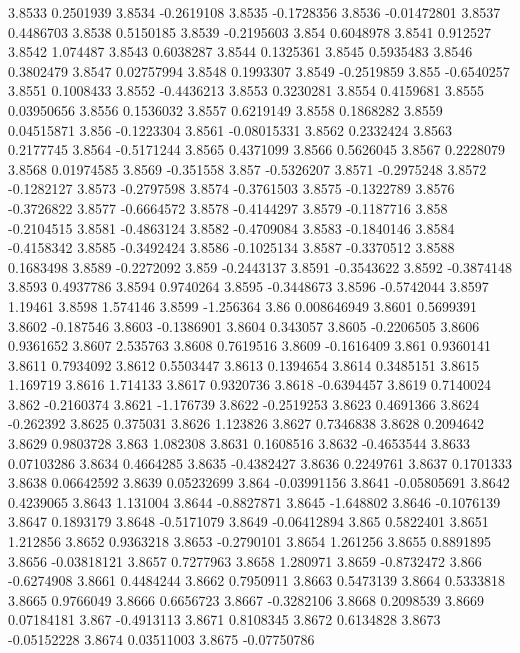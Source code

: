 3.8533  0.2501939
3.8534  -0.2619108
3.8535  -0.1728356
3.8536  -0.01472801
3.8537  0.4486703
3.8538  0.5150185
3.8539  -0.2195603
3.854  0.6048978
3.8541  0.912527
3.8542  1.074487
3.8543  0.6038287
3.8544  0.1325361
3.8545  0.5935483
3.8546  0.3802479
3.8547  0.02757994
3.8548  0.1993307
3.8549  -0.2519859
3.855  -0.6540257
3.8551  0.1008433
3.8552  -0.4436213
3.8553  0.3230281
3.8554  0.4159681
3.8555  0.03950656
3.8556  0.1536032
3.8557  0.6219149
3.8558  0.1868282
3.8559  0.04515871
3.856  -0.1223304
3.8561  -0.08015331
3.8562  0.2332424
3.8563  0.2177745
3.8564  -0.5171244
3.8565  0.4371099
3.8566  0.5626045
3.8567  0.2228079
3.8568  0.01974585
3.8569  -0.351558
3.857  -0.5326207
3.8571  -0.2975248
3.8572  -0.1282127
3.8573  -0.2797598
3.8574  -0.3761503
3.8575  -0.1322789
3.8576  -0.3726822
3.8577  -0.6664572
3.8578  -0.4144297
3.8579  -0.1187716
3.858  -0.2104515
3.8581  -0.4863124
3.8582  -0.4709084
3.8583  -0.1840146
3.8584  -0.4158342
3.8585  -0.3492424
3.8586  -0.1025134
3.8587  -0.3370512
3.8588  0.1683498
3.8589  -0.2272092
3.859  -0.2443137
3.8591  -0.3543622
3.8592  -0.3874148
3.8593  0.4937786
3.8594  0.9740264
3.8595  -0.3448673
3.8596  -0.5742044
3.8597  1.19461
3.8598  1.574146
3.8599  -1.256364
3.86  0.008646949
3.8601  0.5699391
3.8602  -0.187546
3.8603  -0.1386901
3.8604  0.343057
3.8605  -0.2206505
3.8606  0.9361652
3.8607  2.535763
3.8608  0.7619516
3.8609  -0.1616409
3.861  0.9360141
3.8611  0.7934092
3.8612  0.5503447
3.8613  0.1394654
3.8614  0.3485151
3.8615  1.169719
3.8616  1.714133
3.8617  0.9320736
3.8618  -0.6394457
3.8619  0.7140024
3.862  -0.2160374
3.8621  -1.176739
3.8622  -0.2519253
3.8623  0.4691366
3.8624  -0.262392
3.8625  0.375031
3.8626  1.123826
3.8627  0.7346838
3.8628  0.2094642
3.8629  0.9803728
3.863  1.082308
3.8631  0.1608516
3.8632  -0.4653544
3.8633  0.07103286
3.8634  0.4664285
3.8635  -0.4382427
3.8636  0.2249761
3.8637  0.1701333
3.8638  0.06642592
3.8639  0.05232699
3.864  -0.03991156
3.8641  -0.05805691
3.8642  0.4239065
3.8643  1.131004
3.8644  -0.8827871
3.8645  -1.648802
3.8646  -0.1076139
3.8647  0.1893179
3.8648  -0.5171079
3.8649  -0.06412894
3.865  0.5822401
3.8651  1.212856
3.8652  0.9363218
3.8653  -0.2790101
3.8654  1.261256
3.8655  0.8891895
3.8656  -0.03818121
3.8657  0.7277963
3.8658  1.280971
3.8659  -0.8732472
3.866  -0.6274908
3.8661  0.4484244
3.8662  0.7950911
3.8663  0.5473139
3.8664  0.5333818
3.8665  0.9766049
3.8666  0.6656723
3.8667  -0.3282106
3.8668  0.2098539
3.8669  0.07184181
3.867  -0.4913113
3.8671  0.8108345
3.8672  0.6134828
3.8673  -0.05152228
3.8674  0.03511003
3.8675  -0.07750786
